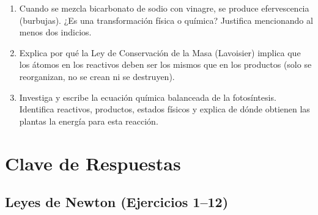 \documentclass[12pt, letterpaper]{article}
\begin{document}
\begin{enumerate}[leftmargin=*, resume]
  \item \dificil{} Cuando se mezcla bicarbonato de sodio con vinagre, se produce efervescencia (burbujas). ¿Es una transformación física o química? Justifica mencionando al menos dos indicios.

  \item \dificil{} Explica por qué la Ley de Conservación de la Masa (Lavoisier) implica que los átomos en los reactivos deben ser los mismos que en los productos (solo se reorganizan, no se crean ni se destruyen).

  \item \dificil{} Investiga y escribe la ecuación química balanceada de la fotosíntesis. Identifica reactivos, productos, estados físicos y explica de dónde obtienen las plantas la energía para esta reacción.
\end{enumerate}

\newpage

\ifmwclaves
  \section{Clave de Respuestas}

  \subsection*{Leyes de Newton (Ejercicios 1--12)}
\end{document}
